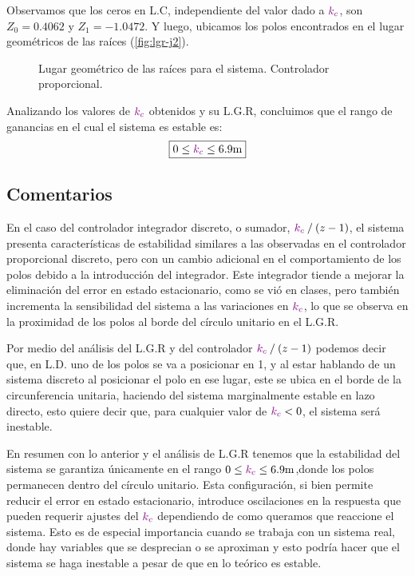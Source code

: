 Observamos que los ceros en L.C, independiente del valor dado a \(\mathbin{\color{violet}k_c}\),
son $Z_{0} = 0.4062 $ y $Z_{1} = -1.0472$. Y luego, ubicamos los polos encontrados
en el lugar geométricos de las raíces (\autoref{fig:lgr-j2}).

\begin{figure}[ht]
  \centering
  
  \caption{Lugar geométrico de las raíces para el sistema. Controlador proporcional.}
  \label{fig:lgr-j2}
\end{figure}


Analizando los valores de \(\mathbin{\color{violet}k_c}\) obtenidos y su L.G.R, concluimos que el
rango de ganancias en el cual el sistema es estable es:
\begin{equation}
  \boxed{ 0 \leq \mora{k_{c}} \leq 6.9\unit{m} }
\end{equation}

\subsection{Comentarios}


En el caso del controlador integrador discreto, o sumador,
\(\mathbin{\color{violet}k_c}\mathbin{/}(z-1)\), el sistema presenta características de estabilidad
similares a las observadas en el controlador proporcional discreto, pero con un
cambio adicional en el comportamiento de los polos debido a la introducción del
integrador. Este integrador tiende a mejorar la eliminación del error en estado
estacionario, como se vió en clases, pero también incrementa la sensibilidad
del sistema a las variaciones en \(\mathbin{\color{violet}k_c}\), lo que se observa en la
proximidad de los polos al borde del círculo unitario en el L.G.R.

Por medio del análisis del L.G.R y del controlador
\(\mathbin{\color{violet}k_c}\mathbin{/}(z-1)\) podemos decir que, en L.D. uno de los polos se
va a posicionar en 1, y al estar hablando de un sistema discreto al posicionar
el polo en ese lugar, este se ubica en el borde de la circunferencia unitaria,
haciendo del sistema marginalmente estable en lazo directo, esto quiere
decir que, para cualquier valor de \(\mathbin{\color{violet}k_c}< 0\), el sistema será inestable.

En resumen con lo anterior y el análisis de L.G.R tenemos que la estabilidad
del sistema se garantiza únicamente en el rango
\(0 \leq \mora{k_{c}} \leq 6.9\unit{m} \),donde los polos permanecen dentro del
círculo unitario. Esta configuración, si bien permite reducir el error en
estado estacionario, introduce oscilaciones en la respuesta que pueden requerir
ajustes del \(\mathbin{\color{violet}k_{c}} \) dependiendo de como queramos que reaccione
el sistema. Esto es de especial importancia cuando se trabaja con un sistema real,
donde hay variables que se desprecian o se aproximan y esto podría hacer que el
sistema se haga inestable a pesar de que en lo teórico es estable. 
